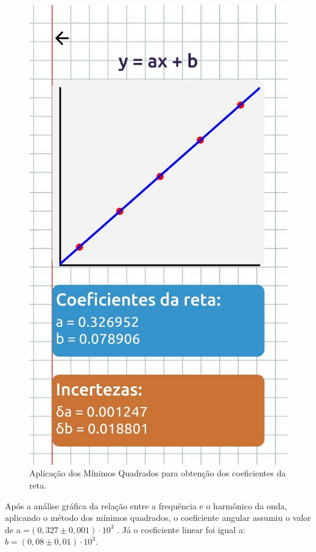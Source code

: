 \begin{figure}[H]
  \centering
  \includegraphics[scale=0.25]{images/Gráfico 2.jpeg}
  \caption{ Aplicação dos Mínimos Quadrados para obtenção dos coeficientes da reta.}
\end{figure}

Após a análise gráfica da relação entre a frequência e o harmônico da onda, aplicando o método dos mínimos quadrados, o coeficiente angular assumiu o valor de a =$(0,327 \pm 0,001)\cdot 10^3$ . Já o coeficiente linear foi igual a: $b =(0,08 \pm 0,01)\cdot 10^3$.

